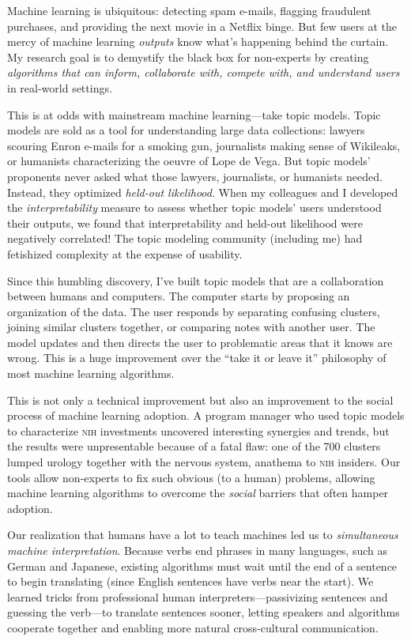 \documentclass[11pt, amssymb, one column]{article}
\begin{document}
Machine learning is ubiquitous: detecting spam e-mails, flagging fraudulent
purchases, and providing the next movie in a Netflix binge.  But few users at
the mercy of machine learning \emph{outputs} know what's happening behind the
curtain.  My research goal is to demystify the black box for non-experts by
creating \emph{algorithms that can inform, collaborate with, compete with, and
  understand users} in real-world settings.

This is at odds with mainstream machine learning---take topic models.  Topic
models are sold as a tool for understanding large data collections: lawyers
scouring Enron e-mails for a smoking gun, journalists making sense of Wikileaks,
or humanists characterizing the oeuvre of Lope de Vega.  But topic models'
proponents never asked what those lawyers, journalists, or humanists
needed. Instead, they optimized \emph{held-out likelihood}. When my colleagues
and I developed the \emph{interpretability} measure to assess whether topic
models' users understood their outputs, we found that interpretability and
held-out likelihood were negatively correlated! The topic
modeling community (including me) had fetishized complexity at the expense of
usability.

Since this humbling discovery, I've built topic models that are a collaboration
between humans and computers.  The computer starts by proposing an organization
of the data.  The user responds by separating confusing clusters, joining
similar clusters together, or comparing notes with another
user.  The model updates and then directs the user to
problematic areas that it knows are wrong.  This is a huge improvement over the
``take it or leave it'' philosophy of most machine learning algorithms.

This is not only a technical improvement but also an improvement to the social
process of machine learning adoption. A program manager who used topic models to
characterize \textsc{nih} investments uncovered interesting synergies and
trends, but the results were unpresentable because of a fatal flaw: one of the
700 clusters lumped urology together with the nervous system, anathema to
\textsc{nih} insiders. Our tools allow non-experts to fix such
obvious (to a human) problems, allowing machine learning
algorithms to overcome the \emph{social} barriers that often hamper adoption.


Our realization that humans have a lot to teach machines led us to
\emph{simultaneous machine interpretation}. Because verbs end phrases
in many languages, such as German and Japanese, existing algorithms
must wait until the end of a sentence to begin translating (since
English sentences have verbs near the start). We learned tricks from
professional human interpreters---passivizing sentences and guessing
the verb---to translate sentences sooner, letting
speakers and algorithms cooperate together and enabling more natural
cross-cultural communication.
\end{document}
